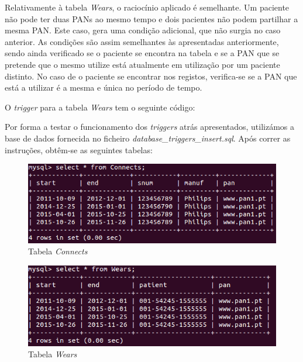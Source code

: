 \documentclass[a4paper]{article}
\begin{document}


Relativamente à tabela \textit{Wears}, o raciocínio aplicado é semelhante. Um paciente não pode ter duas PANs ao mesmo tempo e dois pacientes não podem partilhar a mesma PAN. Este caso, gera uma condição adicional, que não surgia no caso anterior. As condições são assim semelhantes às apresentadas anteriormente, sendo ainda verificado se o paciente se encontra na tabela e se a PAN que se pretende que o mesmo utilize está atualmente em utilização por um paciente distinto. No caso de o paciente se encontrar nos registos, verifica-se se a PAN que está a utilizar é a mesma e única no período de tempo.
\pagebreak

O \textit{trigger} para a tabela \textit{Wears} tem o seguinte código:
\vskip 5mm

\vskip 5mm
Por forma a testar o funcionamento dos \textit{triggers} atrás apresentados, utilizámos a base de dados fornecida no ficheiro \textit{database\_triggers\_insert.sql}. Após correr as instruções, obtêm-se as seguintes tabelas:

\begin{figure}[ht!]
\centering
\includegraphics[scale=0.7]{tabelas_insert_triggers_Connects.png}
\caption{Tabela \textit{Connects}}
\end{figure}

\begin{figure}[ht!]
\centering
\includegraphics[scale=0.7]{tabelas_insert_triggers_Wears.png}
\caption{Tabela \textit{Wears}}
\end{figure}
\end{document}
